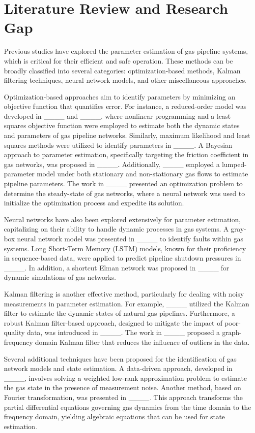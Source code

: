 \section{Literature Review and Research Gap}
Previous studies have explored the parameter estimation of gas pipeline systems, which is critical for their efficient and safe operation. 
These methods can be broadly classified into several categories: optimization-based methods, Kalman filtering techniques, neural network models, and other miscellaneous approaches.

Optimization-based approaches aim to identify parameters by minimizing an objective function that quantifies error. 
For instance, a reduced-order model was developed in ____ and ____, where nonlinear programming and a least squares objective function were employed to estimate both the dynamic states and parameters of gas pipeline networks. 
Similarly, maximum likelihood and least squares methods were utilized to identify parameters in ____.
A Bayesian approach to parameter estimation, specifically targeting the friction coefficient in gas networks, was proposed in ____. 
Additionally, ____ employed a lumped-parameter model under both stationary and non-stationary gas flows to estimate pipeline parameters. 
The work in ____ presented an optimization problem to determine the steady-state of gas networks, where a neural network was used to initialize the optimization process and expedite its solution.

Neural networks have also been explored extensively for parameter estimation, capitalizing on their ability to handle dynamic processes in gas systems. 
A gray-box neural network model was presented in ____ to identify faults within gas systems. 
Long Short-Term Memory (LSTM) models, known for their proficiency in sequence-based data, were applied to predict pipeline shutdown pressures in ____. 
In addition, a shortcut Elman network was proposed in ____ for dynamic simulations of gas networks.

Kalman filtering is another effective method, particularly for dealing with noisy measurements in parameter estimation. 
For example, ____ utilized the Kalman filter to estimate the dynamic states of natural gas pipelines. 
Furthermore, a robust Kalman filter-based approach, designed to mitigate the impact of poor-quality data, was introduced in ____. 
The work in ____ proposed a graph-frequency domain Kalman filter that reduces the influence of outliers in the data.

Several additional techniques have been proposed for the identification of gas network models and state estimation.
A data-driven approach, developed in ____, involves solving a weighted low-rank approximation problem to estimate the gas state in the presence of measurement noise. 
Another method, based on Fourier transformation, was presented in ____. This approach transforms the partial differential equations governing gas dynamics from the time domain to the frequency domain, yielding algebraic equations that can be used for state estimation.

